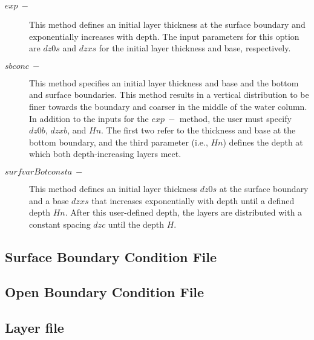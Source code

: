 \begin{description}
    \item [$exp\ -$] This method defines an initial layer thickness at the surface boundary and exponentially increases with depth. The input parameters for this option are $dz0s$ and $dzxs$ for the initial layer thickness and base, respectively. 
    \item [$sbconc\ -$] This method specifies an initial layer thickness and base and the bottom and surface boundaries. This method results in a vertical distribution to be finer towards the boundary and coarser in the middle of the water column. In addition to the inputs for the $exp\ -$ method, the user must specify $dz0b$, $dzxb$, and $Hn$. The first two refer to the thickness and base at the bottom boundary, and the third parameter (i.e., $Hn$) defines the depth at which both depth-increasing layers meet.
    \item [$surfvarBotconsta\ -$] This method defines an initial layer thickness $dz0s$ at the surface boundary and a base $dzxs$ that increases exponentially with depth until a defined depth $Hn$. After this user-defined depth, the layers are distributed with a constant spacing $dzc$ until the depth $H$. 
\end{description}


\subsection{Surface Boundary Condition File}
\label{S:surfbc}


\subsection{Open Boundary Condition File}
\label{S:openbc}

\subsection{Layer file}
\label{S:layer}